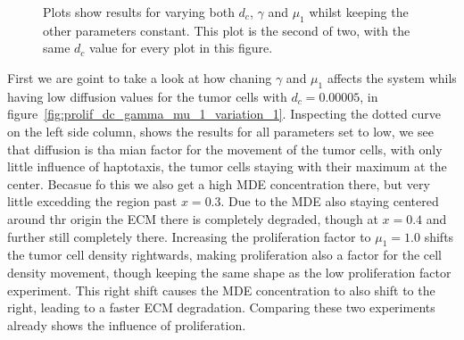 \begin{figure}[h!]
    \centering
    \caption{Plots show results for varying both $d_c$, $\gamma$ and $\mu_1$ whilst keeping the other parameters constant. This plot is the second of two, with the same $d_c$ value for every plot in this figure.}
    \label{fig:prolif_dc_gamma_mu_1_variation_2}
\end{figure}

First we are goint to take a look at how chaning $\gamma$ and $\mu_1$ affects the system whils having low diffusion values for the tumor cells with $d_c=0.00005$, in figure~\ref{fig:prolif_dc_gamma_mu_1_variation_1}. Inspecting the dotted curve on the left side column, shows the results for all parameters set to low, we see that diffusion is tha mian factor for the movement of the tumor cells, with only little influence of haptotaxis, the tumor cells staying with their maximum at the center. Becasue fo this we also get a high MDE concentration there, but very little excedding the region past $x=0.3$. Due to the MDE also staying centered around thr origin the ECM there is completely degraded, though at $x=0.4$ and further still completely there. Increasing the proliferation factor to $\mu_1=1.0$ shifts the tumor cell density rightwards, making proliferation also a factor for the cell density movement, though keeping the same shape as the low proliferation factor experiment. This right shift causes the MDE concentration to also shift to the right, leading to a faster ECM degradation. Comparing these two experiments already shows the influence of proliferation.

